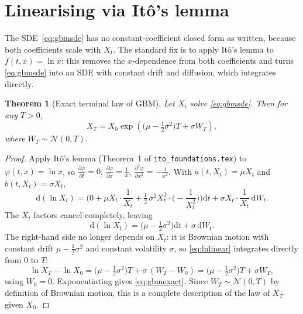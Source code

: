 \documentclass[11pt]{article}
\newcommand{\dd}{\mathrm{d}}
\newcommand{\dW}{\dd W_t}
\newcommand{\dt}{\dd t}
\newcommand{\drift}{a}
\newcommand{\diff}{b}
\theoremstyle{plain}
\newtheorem{theorem}{Theorem}
\theoremstyle{definition}
\theoremstyle{remark}
\begin{document}
\section{Linearising via It\^o's lemma}

The SDE~\eqref{eq:gbmsde} has no constant-coefficient closed form as
written, because both coefficients scale with $X_t$. The standard fix
is to apply It\^o's lemma to $f(t,x)=\ln x$: this removes the
$x$-dependence from both coefficients and turns \eqref{eq:gbmsde} into
an SDE with constant drift and diffusion, which integrates
directly.

\begin{theorem}[Exact terminal law of GBM]\label{thm:gbm-exact}
Let $X_t$ solve \eqref{eq:gbmsde}. Then for any $T>0$,
\begin{equation}\label{eq:gbmexact}
   X_T = X_0\exp\!\left(\Big(\mu-\tfrac12\sigma^2\Big)T + \sigma W_T\right),
\end{equation}
where $W_T\sim\mathcal N(0,T)$.
\end{theorem}

\begin{proof}
Apply It\^o's lemma (Theorem~1 of \texttt{ito\_foundations.tex}) to
$\varphi(t,x)=\ln x$, so $\frac{\partial\varphi}{\partial t}=0$, $\frac{\partial\varphi}{\partial x}=\frac{1}{x}$, $\frac{\partial^2\varphi}{\partial x^2}=-\frac{1}{x^2}$. With
$\drift(t,X_t)=\mu X_t$ and $\diff(t,X_t)=\sigma X_t$,
\[
   \dd(\ln X_t)
     = \Big( 0 + \mu X_t\cdot\frac1{X_t}
             + \tfrac12\,\sigma^2 X_t^2\cdot\Big(\!-\frac1{X_t^2}\Big) \Big)\dt
       + \sigma X_t\cdot\frac1{X_t}\,\dW .
\]
The $X_t$ factors cancel completely, leaving
\begin{equation}\label{eq:lnlinear}
   \dd(\ln X_t) = \Big(\mu-\tfrac12\sigma^2\Big)\dt + \sigma\,\dW .
\end{equation}
The right-hand side no longer depends on $X_t$: it is Brownian motion
with constant drift $\mu-\tfrac12\sigma^2$ and constant volatility
$\sigma$, so \eqref{eq:lnlinear} integrates directly from $0$ to $T$:
\[
   \ln X_T - \ln X_0
     = \Big(\mu-\tfrac12\sigma^2\Big)T + \sigma\,(W_T-W_0)
     = \Big(\mu-\tfrac12\sigma^2\Big)T + \sigma W_T,
\]
using $W_0=0$. Exponentiating gives \eqref{eq:gbmexact}. Since $W_T\sim
\mathcal N(0,T)$ by definition of Brownian motion, this is a complete
description of the law of $X_T$ given $X_0$.
\end{proof}
\end{document}
